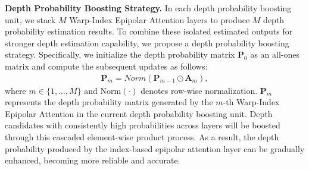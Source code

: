 \noindent \textbf{Depth Probability Boosting Strategy.}
%
In each depth probability boosting unit, we stack $M$ Warp-Index Epipolar Attention layers to produce $M$ depth probability estimation results.
%
To combine these isolated estimated outputs for stronger depth estimation capability, we propose a depth probability boosting strategy.
%
Specifically, we initialize the depth probability matrix $\bm P_{0}$ as an all-ones matrix and compute the subsequent updates as follows:
%
\begin{align}
\label{eq:hd_pa}
    \bm P_{m}= Norm(\bm P_{m-1} \odot \bm A_{m}),
\end{align}
where $m \in \{1,\ldots,M\}$ and $\mathrm{Norm}(\cdot)$ denotes row-wise normalization. $\bm{P}_{m}$ represents the depth probability matrix generated by the $m$-th Warp-Index Epipolar Attention in the current depth probability boosting unit.
%
Depth candidates with consistently high probabilities across layers will be boosted through this cascaded element-wise product process.
%
As a result, the depth probability produced by the index-based epipolar attention layer can be gradually enhanced, becoming more reliable and accurate.


